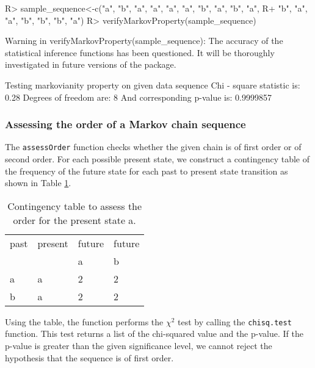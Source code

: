 \documentclass[article,nojss]{jss}
\begin{document}
\begin{CodeChunk}

\begin{CodeInput}
R> sample_sequence<-c("a", "b", "a", "a", "a", "a", "b", "a", "b", "a", 
R+                    "b", "a", "a", "b", "b", "b", "a")
R> verifyMarkovProperty(sample_sequence)
\end{CodeInput}

\begin{CodeOutput}
Warning in verifyMarkovProperty(sample_sequence): The accuracy of the
statistical inference functions has been questioned. It will be thoroughly
investigated in future versions of the package.
\end{CodeOutput}

\begin{CodeOutput}
Testing markovianity property on given data sequence
Chi - square statistic is: 0.28 
Degrees of freedom are: 8 
And corresponding p-value is: 0.9999857 
\end{CodeOutput}
\end{CodeChunk}

\hypertarget{assessing-the-order-of-a-markov-chain-sequence}{%
\subsubsection{Assessing the order of a Markov chain sequence}\label{assessing-the-order-of-a-markov-chain-sequence}}

The \texttt{assessOrder} function checks whether the given chain is of first order or of second order. For each possible present state, we construct a contingency table of the frequency of the future state for each past to present state transition as shown in Table \ref{tab:order}.

\begin{table}[h]
  \centering
  \begin{tabular}{l | l | l | l}
    \hline
  past & present & future & future \\
   &  & a & b \\
    \hline  \hline
  a & a & 2 & 2\\
  b & a & 2 & 2\\
  \hline
\end{tabular}
\caption{Contingency table to assess the order for the present state a.}
\label{tab:order}
\end{table}

Using the table, the function performs the \(\chi ^2\) test by calling the \texttt{chisq.test} function.
This test returns a list of the chi-squared value and the p-value. If the p-value is greater than the given significance level, we cannot reject the hypothesis that the sequence is of first order.
\end{document}
